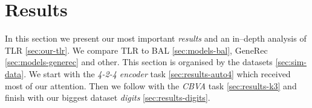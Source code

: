 

\section{Results} 
\label{sec:results} 

In this section we present our most important \emph{results} and an in--depth analysis of TLR \ref{sec:our-tlr}. We compare TLR to BAL \ref{sec:models-bal}, GeneRec \ref{sec:models-generec} and other. This section is organised by the datasets \ref{sec:sim-data}. We start with the \emph{4-2-4 encoder} task \ref{sec:results-auto4} which received most of our attention. Then we follow with the \emph{CBVA} task \ref{sec:results-k3} and finish with our biggest dataset \emph{digits} \ref{sec:results-digits}. 

 

 

 

 

